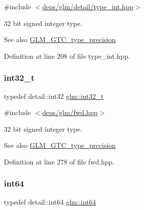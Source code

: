 {\ttfamily \#include $<$\hyperlink{type__int_8hpp}{deps/glm/detail/type\+\_\+int.\+hpp}$>$}

32 bit signed integer type. \begin{DoxySeeAlso}{See also}
\hyperlink{group__gtc__type__precision}{G\+L\+M\+\_\+\+G\+T\+C\+\_\+type\+\_\+precision} 
\end{DoxySeeAlso}


Definition at line 208 of file type\+\_\+int.\+hpp.

\mbox{\label{group__gtc__type__precision_gab870c0eb6f525b0c8c4716762e0fc3a8}} 
\subsubsection{\texorpdfstring{int32\+\_\+t}{int32\_t}}
{\footnotesize\ttfamily typedef detail\+::int32 \hyperlink{group__gtc__type__precision_gab870c0eb6f525b0c8c4716762e0fc3a8}{glm\+::int32\+\_\+t}}



{\ttfamily \#include $<$\hyperlink{fwd_8hpp}{deps/glm/fwd.\+hpp}$>$}

32 bit signed integer type. \begin{DoxySeeAlso}{See also}
\hyperlink{group__gtc__type__precision}{G\+L\+M\+\_\+\+G\+T\+C\+\_\+type\+\_\+precision} 
\end{DoxySeeAlso}


Definition at line 278 of file fwd.\+hpp.

\mbox{\label{group__gtc__type__precision_ga435d75819cce297cc5fa21bd84ef89a5}} 
\subsubsection{\texorpdfstring{int64}{int64}}
{\footnotesize\ttfamily typedef detail\+::int64 \hyperlink{group__gtc__type__precision_ga435d75819cce297cc5fa21bd84ef89a5}{glm\+::int64}}



